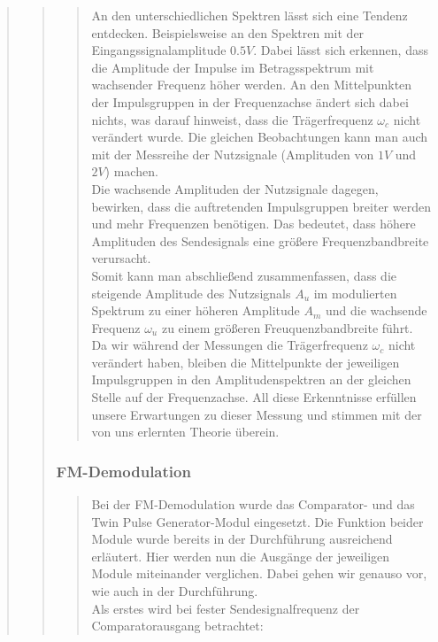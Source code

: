 \begin{quote}
\begin{quote}
\begin{quote}
            
            An den unterschiedlichen Spektren lässt sich eine Tendenz
            entdecken. Beispielsweise an den Spektren mit der
            Eingangssignalamplitude $0.5 V$. Dabei lässt sich erkennen, dass die Amplitude 
            der Impulse im Betragsspektrum mit wachsender Frequenz höher werden. An den
            Mittelpunkten der Impulsgruppen in der Frequenzachse ändert sich
            dabei nichts, was darauf hinweist, dass die Trägerfrequenz
            $\omega_c$ nicht verändert wurde. Die gleichen Beobachtungen kann
            man auch mit der Messreihe der Nutzsignale (Amplituden von $1V$ und
            $2V$) machen.\\
            Die wachsende Amplituden der Nutzsignale dagegen, bewirken, dass die
            auftretenden Impulsgruppen breiter werden und mehr Frequenzen
            benötigen. Das bedeutet, dass höhere Amplituden des Sendesignals
            eine größere Frequenzbandbreite verursacht.\\
            
            Somit kann man abschließend zusammenfassen,
            dass die steigende Amplitude des Nutzsignals $A_u$ im modulierten
            Spektrum zu einer höheren Amplitude $A_m$ und die wachsende Frequenz
            $\omega_u$ zu einem größeren Freuquenzbandbreite führt. Da wir
            während der Messungen die Trägerfrequenz $\omega_c$ nicht verändert
            haben, bleiben die Mittelpunkte der jeweiligen Impulsgruppen in den
            Amplitudenspektren an der gleichen Stelle auf der Frequenzachse. All
            diese Erkenntnisse erfüllen unsere Erwartungen zu dieser
            Messung und stimmen mit der von uns erlernten Theorie überein.
           
       \end{quote}
            
  	     \subsubsection{FM-Demodulation}
           \begin{quote}
            
            Bei der FM-Demodulation wurde das Comparator- und das Twin Pulse
            Generator-Modul eingesetzt. Die Funktion beider Module wurde bereits
            in der Durchführung ausreichend erläutert. Hier werden nun die
            Ausgänge der jeweiligen Module miteinander verglichen. Dabei gehen
            wir genauso vor, wie auch in der Durchführung.\\
            Als erstes wird bei fester Sendesignalfrequenz der Comparatorausgang
            betrachtet:
            

\end{quote}
\end{quote}
\end{quote}

